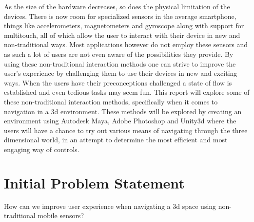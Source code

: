 As the size of the hardware decreases, so does the physical limitation of the devices. There is now room for specialized sensors in the average smartphone, things like accelerometers, magnetometers and gyroscope along with support for multitouch, all of which allow the user to interact with their device in new and non-traditional ways.
Most applications however do not employ these sensors and as such a lot of users are not even aware of the possibilities they provide.
By using these non-traditional interaction methods one can strive to improve the user's experience by challenging them to use their devices in new and exciting ways. When the users have their preconceptions challenged a state of flow is established and even tedious tasks may seem fun.
This report will explore some of these non-traditional interaction methods, specifically when it comes to navigation in a 3d environment.
These methods will be explored by creating an environment using Autodesk Maya, Adobe Photoshop and Unity3d where the users will have a chance to try out various means of navigating through the three dimensional world, in an attempt to determine the most efficient and most engaging way of controls.

\section{Initial Problem Statement}
How can we improve user experience when navigating a 3d space using non-traditional mobile sensors?
